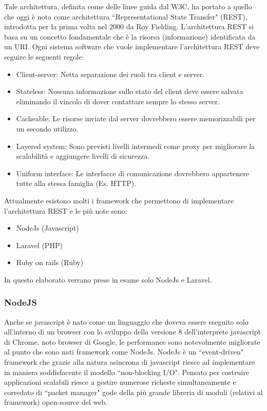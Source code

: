 Tale architettura, definita come delle linee guida dal W3C, ha portato a quello che oggi è nota come architettura ``Representational State Transfer" (REST), introdotta per la prima volta nel 2000 da Roy Fielding. L'architettura REST si basa su un concetto fondamentale che è la risorsa (informazione) identificata da un URI. Ogni sistema software che vuole implementare l'architettura REST deve seguire le seguenti regole:
\begin{itemize}
	\item Client-server: Netta separazione dei ruoli tra client e server.
	\item Stateless: Nessuna informazione sullo stato del client deve essere salvata eliminando il vincolo di dover contattare sempre lo stesso server.
	\item Cacheable: Le risorse inviate dal server dovrebbero essere memorizzabili per un secondo utilizzo.
	\item Layered system: Sono previsti livelli intermedi come proxy per migliorare la scalabilità e aggiungere livelli di sicurezza.
	\item Uniform interface: Le interfacce di comunicazione dovrebbero appartenere tutte alla stessa famiglia (Es. HTTP).
\end{itemize}

Attualmente esistono molti i framework che permettono di implementare l'architettura REST e le più note sono:
\begin{itemize}
	\item NodeJs (Javascript)
	\item Laravel (PHP)
	\item Ruby on rails (Ruby)
\end{itemize}
In questo elaborato verrano prese in esame solo NodeJs e Laravel.


\subsubsection{NodeJS}
Anche se javascript è nato come un linguaggio che doveva essere eseguito solo all'interno di un browser con lo sviluppo della versione 8 dell'interprete javascript di Chrome, noto browser di Google, le performance sono notevolmente migliorate al punto che sono nati framework come NodeJs. NodeJs è un ``event-driven" framework che grazie alla natura asincrona di javascript riesce ad implementare in maniera soddisfacente il modello ``non-blocking I/O". Pensato per costruire applicazioni scalabili riesce a gestire numerose richeste simultaneamente e corredato di ``packet manager" gode della più grande libreria di moduli (relativi al framework) open-source del web.

